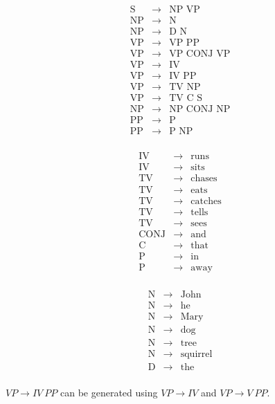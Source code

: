 \documentclass[12pt]{article}
\newcommand{\nlcfgrule}[2]{\textrm{#1} & \rightarrow & \textrm{#2} \nonumber}
\begin{document}
\begin{exe}
\begin{minipage}[t]{5cm}
\begin{eqnarray*}
\nlcfgrule{S}{NP\ VP}\\
\nlcfgrule{NP}{N}\\
\nlcfgrule{NP}{D\ N}\\
\nlcfgrule{VP}{VP\ PP}\\
\nlcfgrule{VP}{VP\ CONJ\ VP}\\
\nlcfgrule{VP}{IV}\\
\nlcfgrule{VP}{IV\ PP}\\
\nlcfgrule{VP}{TV\ NP}\\
\nlcfgrule{VP}{TV\ C\ S}\\
\nlcfgrule{NP}{NP\ CONJ\ NP}\\
\nlcfgrule{PP}{P}\\
\nlcfgrule{PP}{P\ NP}\\
\end{eqnarray*}
\end{minipage}
\begin{minipage}[t]{5cm}
\begin{eqnarray*}
\nlcfgrule{IV}{runs}\\
\nlcfgrule{IV}{sits}\\
\nlcfgrule{TV}{chases}\\
\nlcfgrule{TV}{eats}\\
\nlcfgrule{TV}{catches}\\
\nlcfgrule{TV}{tells}\\
\nlcfgrule{TV}{sees}\\
\nlcfgrule{CONJ}{and}\\
\nlcfgrule{C}{that}\\
\nlcfgrule{P}{in}\\
\nlcfgrule{P}{away}\\
\end{eqnarray*}
\end{minipage}
\begin{minipage}[t]{5cm}
\begin{eqnarray*}
\nlcfgrule{N}{John}\\
\nlcfgrule{N}{he}\\
\nlcfgrule{N}{Mary}\\
\nlcfgrule{N}{dog}\\
\nlcfgrule{N}{tree}\\
\nlcfgrule{N}{squirrel}\\
\nlcfgrule{D}{the}\\
\end{eqnarray*}
\end{minipage}

\begin{soln}
$VP \rightarrow IV\ PP$ can be generated using $VP \rightarrow IV$ and $VP \rightarrow V\ PP$.
\end{soln}

\end{exe}
\end{document}
